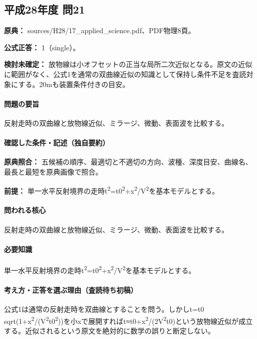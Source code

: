 \subsection{平成28年度 問21}
\label{q:h28-reg-applied-21}

\noindent\textbf{原典：} sources/H28/17\_applied\_science.pdf、PDF物理8頁。

\textbf{公式正答：} 1（single）。

\par\textbf{検討未確定：} 放物線は小オフセットの正当な局所二次近似となる。原文の近似に範囲がなく、公式1を通常の双曲線近似の知識として保持し条件不足を査読対象にする。20mも装置条件付きの目安。

\paragraph{問題の要旨} 反射走時の双曲線と放物線近似、ミラージ、微動、表面波を比較する。

\paragraph{確認した条件・記述（独自要約）}\mbox{}\par

\noindent\textbf{原典照合：} 五候補の順序、最適切と不適切の方向、波種、深度目安、曲線名、最長と最短を原典画像で照合。\par

\noindent\textbf{前提：} 単一水平反射境界の走時t\textsuperscript{2}=t0\textsuperscript{2}+x\textsuperscript{2}/V\textsuperscript{2}を基本モデルとする。\par

\paragraph{問われる核心} 反射走時の双曲線と放物線近似、ミラージ、微動、表面波を比較する。

\paragraph{必要知識} 単一水平反射境界の走時t\textsuperscript{2}=t0\textsuperscript{2}+x\textsuperscript{2}/V\textsuperscript{2}を基本モデルとする。

\paragraph{考え方・正答を選ぶ理由（査読待ち初稿）} 公式1は通常の反射走時を双曲線とすることを問う。しかしt=\allowbreak{}t0 sqrt(1+x\textsuperscript{2}/(V\textsuperscript{2}t0\textsuperscript{2}))を小xで展開すればt≈t0+x\textsuperscript{2}/(2V\textsuperscript{2}t0)という放物線近似が成立する。近似されるという原文を絶対的に数学の誤りと断定しない。

